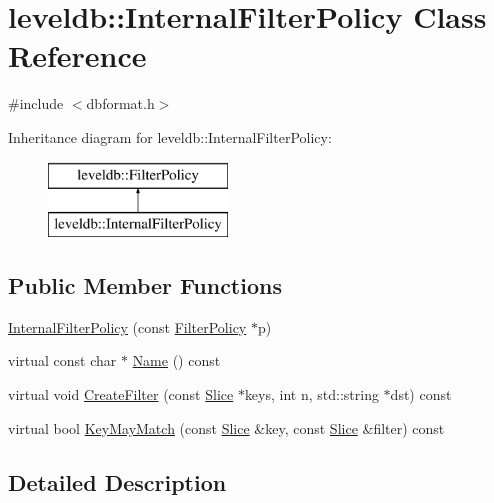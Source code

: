 \hypertarget{classleveldb_1_1_internal_filter_policy}{}\section{leveldb\+:\+:Internal\+Filter\+Policy Class Reference}
\label{classleveldb_1_1_internal_filter_policy}


{\ttfamily \#include $<$dbformat.\+h$>$}

Inheritance diagram for leveldb\+:\+:Internal\+Filter\+Policy\+:\begin{figure}[H]
\begin{center}
\leavevmode
\includegraphics[height=2.000000cm]{classleveldb_1_1_internal_filter_policy}
\end{center}
\end{figure}
\subsection*{Public Member Functions}
\begin{DoxyCompactItemize}
\item 
\hyperlink{classleveldb_1_1_internal_filter_policy_a55469eb6ea941243cd1c65eb14bd8978}{Internal\+Filter\+Policy} (const \hyperlink{classleveldb_1_1_filter_policy}{Filter\+Policy} $\ast$p)
\item 
virtual const char $\ast$ \hyperlink{classleveldb_1_1_internal_filter_policy_ab7f6002d74ba6a2838e1fc826e2095fc}{Name} () const 
\item 
virtual void \hyperlink{classleveldb_1_1_internal_filter_policy_a1c7c7b7eecdfb872e35708793d82ab40}{Create\+Filter} (const \hyperlink{classleveldb_1_1_slice}{Slice} $\ast$keys, int n, std\+::string $\ast$dst) const 
\item 
virtual bool \hyperlink{classleveldb_1_1_internal_filter_policy_a42dc5124aa139c68bec2efa7417a7373}{Key\+May\+Match} (const \hyperlink{classleveldb_1_1_slice}{Slice} \&key, const \hyperlink{classleveldb_1_1_slice}{Slice} \&filter) const 
\end{DoxyCompactItemize}


\subsection{Detailed Description}


